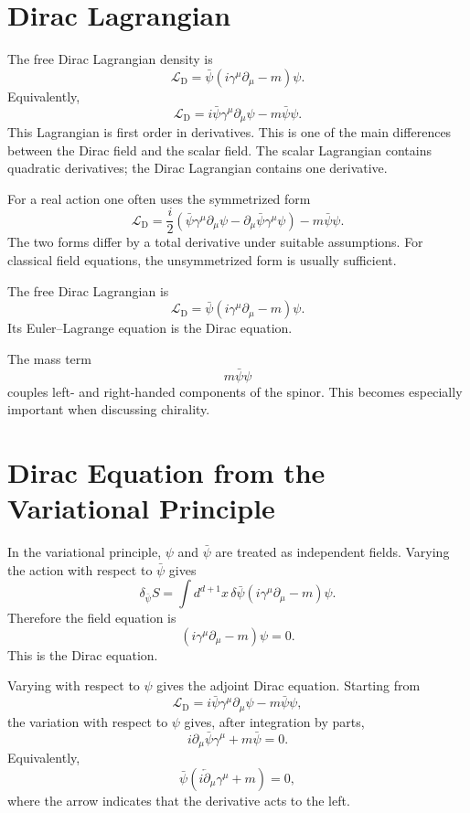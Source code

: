 \section{Dirac Lagrangian}

The free Dirac Lagrangian density is
\[
    \mathcal{L}_{\mathrm{D}}
    =\bar\psi(i\gamma^\mu\partial_\mu-m)\psi.
\]
Equivalently,
\[
    \mathcal{L}_{\mathrm{D}}
    =i\bar\psi\gamma^\mu\partial_\mu\psi-m\bar\psi\psi.
\]
This Lagrangian is first order in derivatives. This is one of the main
differences between the Dirac field and the scalar field. The scalar Lagrangian
contains quadratic derivatives; the Dirac Lagrangian contains one derivative.

For a real action one often uses the symmetrized form
\[
    \mathcal{L}_{\mathrm{D}}
    =\frac{i}{2}\left(
        \bar\psi\gamma^\mu\partial_\mu\psi
        -\partial_\mu\bar\psi\gamma^\mu\psi
    \right)-m\bar\psi\psi.
\]
The two forms differ by a total derivative under suitable assumptions. For
classical field equations, the unsymmetrized form is usually sufficient.

\begin{definitionbox}
The free Dirac Lagrangian is
\[
    \mathcal{L}_{\mathrm{D}}=\bar\psi(i\gamma^\mu\partial_\mu-m)\psi.
\]
Its Euler--Lagrange equation is the Dirac equation.
\end{definitionbox}

The mass term
\[
    m\bar\psi\psi
\]
couples left- and right-handed components of the spinor. This becomes especially
important when discussing chirality.

\section{Dirac Equation from the Variational Principle}

In the variational principle, \(\psi\) and \(\bar\psi\) are treated as
independent fields. Varying the action with respect to \(\bar\psi\) gives
\[
    \delta_{\bar\psi}S
    =\int d^{d+1}x\,\delta\bar\psi(i\gamma^\mu\partial_\mu-m)\psi.
\]
Therefore the field equation is
\[
    (i\gamma^\mu\partial_\mu-m)\psi=0.
\]
This is the Dirac equation.

Varying with respect to \(\psi\) gives the adjoint Dirac equation. Starting from
\[
    \mathcal{L}_{\mathrm{D}}
    =i\bar\psi\gamma^\mu\partial_\mu\psi-m\bar\psi\psi,
\]
the variation with respect to \(\psi\) gives, after integration by parts,
\[
    i\partial_\mu\bar\psi\gamma^\mu+m\bar\psi=0.
\]
Equivalently,
\[
    \bar\psi(i\overleftarrow{\partial}_\mu\gamma^\mu+m)=0,
\]
where the arrow indicates that the derivative acts to the left.

